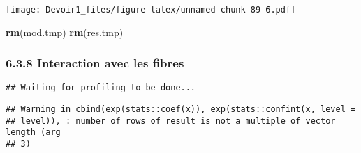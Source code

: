 \documentclass[]{article}
\newenvironment{Shaded}{\begin{snugshade}}{\end{snugshade}}
\newcommand{\KeywordTok}[1]{\textcolor[rgb]{0.13,0.29,0.53}{\textbf{#1}}}
\newcommand{\DataTypeTok}[1]{\textcolor[rgb]{0.13,0.29,0.53}{#1}}
\newcommand{\DecValTok}[1]{\textcolor[rgb]{0.00,0.00,0.81}{#1}}
\newcommand{\StringTok}[1]{\textcolor[rgb]{0.31,0.60,0.02}{#1}}
\newcommand{\OperatorTok}[1]{\textcolor[rgb]{0.81,0.36,0.00}{\textbf{#1}}}
\newcommand{\NormalTok}[1]{#1}
\begin{document}
\texttt{[image: Devoir1\_files/figure-latex/unnamed-chunk-89-6.pdf]}

\begin{Shaded}
\begin{Highlighting}[]
\KeywordTok{rm}\NormalTok{(mod.tmp)}
\KeywordTok{rm}\NormalTok{(res.tmp)}
\end{Highlighting}
\end{Shaded}

\subsubsection{6.3.8 Interaction avec les
fibres}\label{interaction-avec-les-fibres}

\begin{Shaded}
\end{Shaded}

\begin{verbatim}
## Waiting for profiling to be done...
\end{verbatim}

\begin{verbatim}
## Warning in cbind(exp(stats::coef(x)), exp(stats::confint(x, level =
## level)), : number of rows of result is not a multiple of vector length (arg
## 3)
\end{verbatim}
\end{document}
